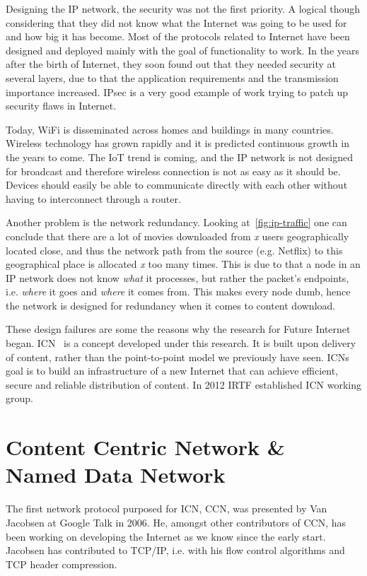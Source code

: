 Designing the \gls{IP} network, the security was not the first priority.
A logical though considering that they did not know what the Internet was going to be used for and how big it has become.
Most of the protocols related to Internet have been designed and deployed mainly with the goal of functionality to work.
In the years after the birth of Internet, they soon found out that they needed security at several layers, due to that the application requirements and the transmission importance increased.
\gls{IPsec} is a very good example of work trying to patch up security flaws in Internet.

Today, WiFi is disseminated across homes and buildings in many countries. 
Wireless technology has grown rapidly and it is predicted continuous growth in the years to come. 
The \gls{IoT} trend is coming, and the \gls{IP} network is not designed for broadcast and therefore wireless connection is not as easy as it should be.
Devices should easily be able to communicate directly with each other without having to interconnect through a router.

Another problem is the network redundancy. 
Looking at~\autoref{fig:ip-traffic} one can conclude that there are a lot of movies downloaded from \textit{x} users geographically located close, and thus the network path from the source (e.g. Netflix) to this geographical place is allocated \textit{x} too many times. 
This is due to that a node in an \gls{IP} network does not know \textit{what} it processes, but rather the packet's endpoints, i.e. \textit{where} it goes and \textit{where} it comes from. 
This makes every node dumb, hence the network is designed for redundancy when it comes to content download.

These design failures are some the reasons why the research for Future Internet began.  
\gls{ICN}~\cite{DBLP:journals/cm/AhlgrenDIKO12} is a concept developed under this research.
It is built upon delivery of content, rather than the point-to-point model we previously have seen.
\gls{ICN}s goal is to build an infrastructure of a new Internet that can achieve efficient, secure and reliable distribution of content.
In 2012 \gls{IRTF} established \gls{ICN} working group.


\section{Content Centric Network \& Named Data Network}\label{chp2:sec:icn}
The first network protocol purposed for \gls{ICN}, \gls{CCN}, was presented by Van Jacobsen at Google Talk in 2006. 
He, amongst other contributors of \gls{CCN}, has been working on developing the Internet as we know since the early start.
Jacobsen has contributed to \gls{TCP}/\gls{IP}, i.e. with his flow control algorithms and \gls{TCP} header compression. 

